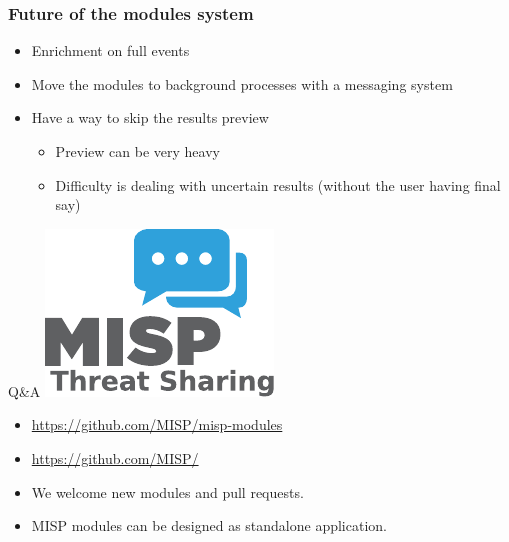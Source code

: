 \begin{frame}[fragile]
    \frametitle{Future of the modules system}
    \begin{itemize}
        \item Enrichment on full events
        \item Move the modules to background processes with a messaging system
        \item Have a way to skip the results preview
        \begin{itemize}
            \item Preview can be very heavy
            \item Difficulty is dealing with uncertain results (without the user having final say)
        \end{itemize}
    \end{itemize}
\end{frame}

\begin{frame}[t,fragile] {Q\&A}
\includegraphics[scale=0.5]{misplogo.pdf}
\begin{itemize}
        \item \url{https://github.com/MISP/misp-modules}
        \item \url{https://github.com/MISP/}
        \item We welcome new modules and pull requests.
        \item MISP modules can be designed as standalone application.
\end{itemize}

\end{frame}
